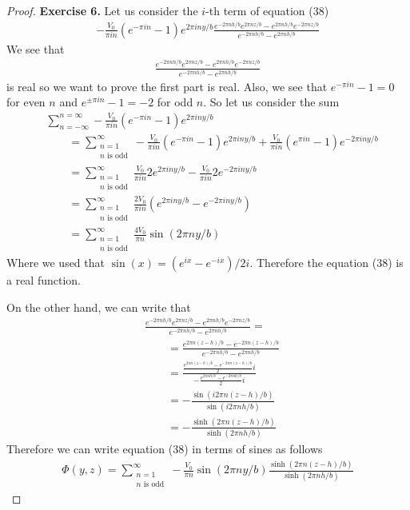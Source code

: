 \documentclass[11pt]{article}
\theoremstyle{definition}
\begin{document}
\begin{proof}{\textbf{Exercise 6.}}
Let us consider the $i$-th term of equation (38)
\begin{align*}
    -\frac{V_0}{\pi i n}(e^{-\pi i n} - 1)e^{2\pi iny/b}
    \frac{e^{-2\pi nh/b}e^{2\pi nz/b} - e^{2\pi nh/b}e^{-2\pi nz/b}}
    {e^{-2\pi nh/b}-e^{2\pi nh/b}} 
\end{align*}
We see that
\begin{align*}
    \frac{e^{-2\pi nh/b}e^{2\pi nz/b} - e^{2\pi nh/b}e^{-2\pi nz/b}}
    {e^{-2\pi nh/b}-e^{2\pi nh/b}}   
\end{align*}
is real so we want to prove the first part is real. Also, we see that
$e^{-\pi i n} - 1 = 0$ for even $n$ and $e^{\pm\pi i n} - 1 = -2$ for odd $n$.
So let us consider the sum
\begin{align*}
    &\sum_{n=-\infty}^{n=\infty}
    -\frac{V_0}{\pi i n}(e^{-\pi i n} - 1)e^{2\pi iny/b}\\
    &\qquad= \sum_{\substack{n=1\\n\text{ is odd}}}^{\infty}
    -\frac{V_0}{\pi i n}(e^{-\pi i n} - 1)e^{2\pi iny/b}
    + \frac{V_0}{\pi i n}(e^{\pi i n} - 1)e^{-2\pi iny/b}\\
    &\qquad= \sum_{\substack{n=1\\n\text{ is odd}}}^{\infty}
    \frac{V_0}{\pi i n}2e^{2\pi iny/b} - \frac{V_0}{\pi i n}2e^{-2\pi iny/b}\\
    &\qquad= \sum_{\substack{n=1\\n\text{ is odd}}}^{\infty}
    \frac{2V_0}{\pi i n}(e^{2\pi iny/b} - e^{-2\pi iny/b})\\
    &\qquad= \sum_{\substack{n=1\\n\text{ is odd}}}^{\infty}
    \frac{4V_0}{\pi n}\sin(2\pi ny/b)
\end{align*}
Where we used that $\sin(x) = (e^{ix} - e^{-ix})/2i$. Therefore the equation
(38) is a real function.

On the other hand, we can write that
\begin{align*}
    &\frac{e^{-2\pi nh/b}e^{2\pi nz/b} - e^{2\pi nh/b}e^{-2\pi nz/b}}
    {e^{-2\pi nh/b}-e^{2\pi nh/b}} = \\
    &\qquad= \frac{e^{2\pi n(z-h)/b} - e^{-2\pi n(z-h)/b}}
    {e^{-2\pi nh/b}-e^{2\pi nh/b}}\\
    &\qquad= \frac{\frac{e^{2\pi n(z-h)/b} - e^{-2\pi n(z-h)/b}}{2}i}
    {-\frac{e^{2\pi nh/b}-e^{-2\pi nh/b}}{2}i}\\
    &\qquad= -\frac{\sin(i2\pi n(z-h)/b)}{\sin(i2\pi n h/b)}\\
    &\qquad= -\frac{\sinh(2\pi n(z-h)/b)}{\sinh(2\pi n h/b)}
\end{align*}
Therefore we can write equation (38) in terms of sines as follows
\begin{align*}
    \Phi(y,z)
    = \sum_{\substack{n=1\\n\text{ is odd}}}^{\infty}
    -\frac{V_0}{\pi n}\sin(2\pi ny/b)
    \frac{\sinh(2\pi n(z-h)/b)}{\sinh(2\pi n h/b)}
\end{align*}
\end{proof}
\end{document}
